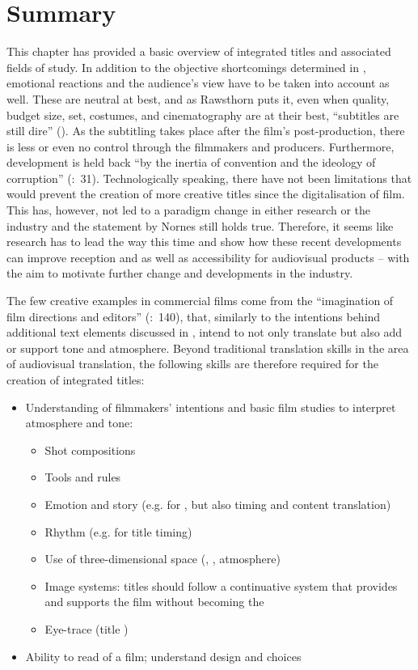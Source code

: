 \section{Summary}\label{sec:3.5}

This chapter has provided a basic overview of integrated titles and associated fields of study. In addition to the objective shortcomings determined in , emotional reactions and the audience’s view have to be taken into account as well. These are neutral at best, and as Rawsthorn puts it, even when quality, budget size, set, costumes, and cinematography are at their best, “subtitles are still dire” (\citeyear{rawsthorn2007}). As the subtitling takes place after the film’s post-production, there is less or even no control through the filmmakers and producers. Furthermore, development is held back “by the inertia of convention and the ideology of corruption” (\citealt{nornes1999}:~31). Technologically speaking, there have not been limitations that would prevent the creation of more creative titles since the digitalisation of film. This has, however, not led to a paradigm change in either research or the industry and the statement by Nornes still holds true. Therefore, it seems like research has to lead the way this time and show how these recent developments can improve reception and  as well as accessibility for audiovisual products – with the aim to motivate further change and developments in the industry.

The few creative examples in commercial films come from the “imagination of film directions and editors” (\citealt{mcclarty2012}:~140), that, similarly to the intentions behind additional text elements discussed in , intend to not only translate but also add or support tone and atmosphere. Beyond traditional translation skills in the area of audiovisual translation, the following skills are therefore required for the creation of integrated titles:

\begin{itemize}
\item Understanding of filmmakers’ intentions and basic film studies to interpret atmosphere and tone:
  \begin{itemize}
  \item Shot compositions
  \item Tools and rules
  \item Emotion and story (e.g. for , but also timing and content translation)
  \item Rhythm (e.g. for title timing)
  \item Use of three-dimensional space (, , atmosphere)
  \item Image systems: titles should follow a continuative system that provides  and supports the film without becoming the 
  \item Eye-trace (title )
  \end{itemize}
\item Ability to read  of a film; understand design and  choices
\end{itemize}

